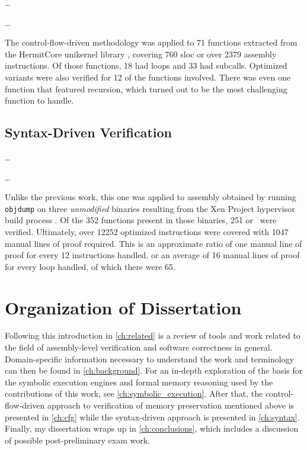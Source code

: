 \todo\dots

\todo\dots

The control-flow-driven methodology was applied to \num{71} functions
extracted from the HermitCore \cite{lankes2016hermitcore}
unikernel library \autocite{madhavapeddy2014unikernels},
covering \num{760} \ac{sloc} or over \num{2379} assembly instructions.
Of those functions, 18 had loops and 33 had subcalls.
Optimized variants were also verified for 12 of the functions involved.
There was even one function that featured recursion,
which turned out to be the most challenging function to handle.

\subsection{Syntax-Driven Verification}
\todo\dots

\todo\dots

Unlike the previous work, this one was applied to assembly obtained
by running \texttt{objdump} on three \emph{unmodified} binaries resulting from the
Xen Project hypervisor build process \autocite{chisnall2008definitive}.
Of the \num{352} functions present in those binaries,
\num{251} or \xenpercentage\ were verified.
Ultimately, over \num{12252} optimized instructions were covered
with \num{1047} manual lines of proof required.
This is an approximate ratio of one manual line of proof
for every \num{12} instructions handled,
or an average of \num{16} manual lines of proof for every loop handled,
of which there were \num{65}.

\section{Organization of Dissertation}
Following this introduction in \cref{ch:related} is a review of tools and work
related to the field of assembly-level verification and software correctness in general.
Domain-specific information necessary to understand the work
and terminology can then be found in \cref{ch:background}.
For an in-depth exploration of the basis for the symbolic execution engines
and formal memory reasoning used by the contributions of this work,
see \cref{ch:symbolic_execution}.
After that, the control-flow-driven approach to verification of memory preservation
mentioned above is presented in \cref{ch:cfg}
while the syntax-driven approach is presented in \cref{ch:syntax}.
Finally, my dissertation wraps up in \cref{ch:conclusions},
which includes a discussion of possible post-preliminary exam work.
